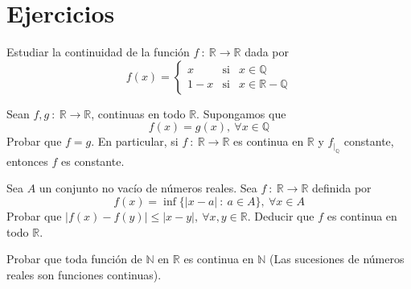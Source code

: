 
\section{Ejercicios}
\begin{ejercicio}
    Estudiar la continuidad de la función $f ~:~ \mathbb{R} \longrightarrow \mathbb{R}$ dada por
    \begin{equation*}
        f(x) =
        \left\{ \begin{array}{ccl}
            x & \text{si} & x \in \mathbb{Q} \\
            1-x & \text{si} & x \in \mathbb{R} - \mathbb{Q}
            \end{array}
        \right.
    \end{equation*}
\end{ejercicio}

\begin{ejercicio}
    Sean $f,g ~:~ \mathbb{R} \longrightarrow \mathbb{R}$, continuas en todo $\mathbb{R}$. Supongamos que
    \begin{equation*}
        f(x) = g(x), ~ \forall x \in \mathbb{Q}
    \end{equation*}
    Probar que $f = g$. En particular, si $f ~:~ \mathbb{R} \longrightarrow \mathbb{R}$ es continua en $\mathbb{R}$ y
    $f_{|_{\mathbb{Q}}}$ constante, entonces $f$ es constante.
\end{ejercicio}

\begin{ejercicio}
    Sea $A$ un conjunto no vacío de números reales. Sea $f ~:~ \mathbb{R} \longrightarrow \mathbb{R}$
    definida por
    \begin{equation*}
        f(x) = \inf \{|x-a| ~:~ a \in A\}, ~ \forall x \in A
    \end{equation*}
    Probar que $|f(x)-f(y)| \leq |x-y|, ~ \forall x,y \in \mathbb{R}$. Deducir que $f$ es continua en todo $\mathbb{R}$.
\end{ejercicio}

\begin{ejercicio}
    Probar que toda función de $\mathbb{N}$ en $\mathbb{R}$ es continua en $\mathbb{N}$ (Las sucesiones de números reales son funciones continuas).
\end{ejercicio}

